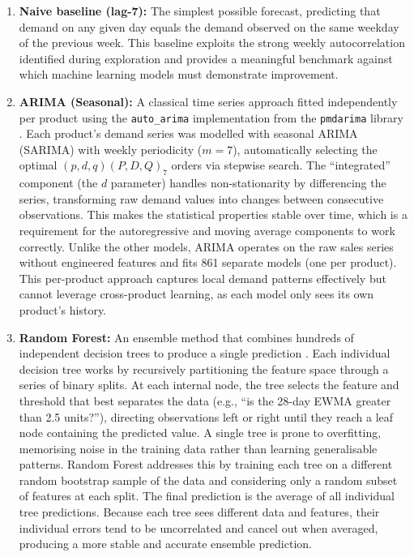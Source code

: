 \begin{enumerate}
    \item \textbf{Naive baseline (lag-7):} The simplest possible forecast, predicting that demand on any given day equals the demand observed on the same weekday of the previous week. This baseline exploits the strong weekly autocorrelation identified during exploration and provides a meaningful benchmark against which machine learning models must demonstrate improvement.

    \item \textbf{ARIMA (Seasonal):} A classical time series approach fitted independently per product using the \texttt{auto\_arima} implementation from the \texttt{pmdarima} library \citep{smith2017pmdarima}. Each product's demand series was modelled with seasonal ARIMA (SARIMA) with weekly periodicity ($m=7$), automatically selecting the optimal $(p,d,q)(P,D,Q)_7$ orders via stepwise search. The ``integrated'' component (the $d$ parameter) handles non-stationarity by differencing the series, transforming raw demand values into changes between consecutive observations. This makes the statistical properties stable over time, which is a requirement for the autoregressive and moving average components to work correctly. Unlike the other models, ARIMA operates on the raw sales series without engineered features and fits 861 separate models (one per product). This per-product approach captures local demand patterns effectively but cannot leverage cross-product learning, as each model only sees its own product's history.

    \item \textbf{Random Forest:} An ensemble method that combines hundreds of independent decision trees to produce a single prediction \citep{pedregosa2011sklearn}. Each individual decision tree works by recursively partitioning the feature space through a series of binary splits. At each internal node, the tree selects the feature and threshold that best separates the data (e.g., ``is the 28-day EWMA greater than 2.5 units?''), directing observations left or right until they reach a leaf node containing the predicted value. A single tree is prone to overfitting, memorising noise in the training data rather than learning generalisable patterns. Random Forest addresses this by training each tree on a different random bootstrap sample of the data and considering only a random subset of features at each split. The final prediction is the average of all individual tree predictions. Because each tree sees different data and features, their individual errors tend to be uncorrelated and cancel out when averaged, producing a more stable and accurate ensemble prediction.


\end{enumerate}
